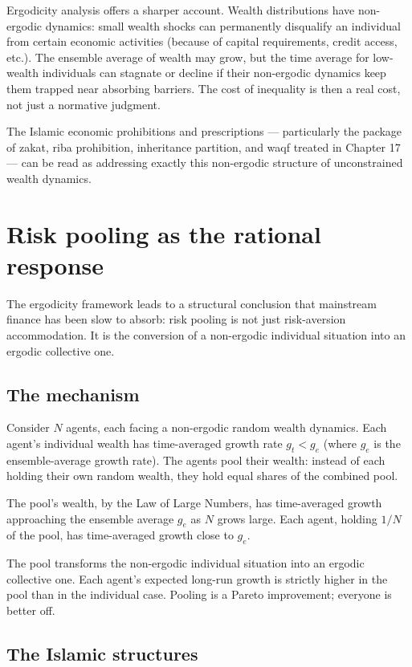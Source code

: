 Ergodicity analysis offers a sharper account. Wealth distributions
have non-ergodic dynamics: small wealth shocks can permanently
disqualify an individual from certain economic activities (because
of capital requirements, credit access, etc.). The ensemble average
of wealth may grow, but the time average for low-wealth individuals
can stagnate or decline if their non-ergodic dynamics keep them
trapped near absorbing barriers. The cost of inequality is then a
real cost, not just a normative judgment.

The Islamic economic prohibitions and prescriptions ---
particularly the package of zakat, riba prohibition, inheritance
partition, and waqf treated in Chapter 17 --- can be read as
addressing exactly this non-ergodic structure of unconstrained
wealth dynamics.

\section{Risk pooling as the rational response}
\label{sec:risk-pooling}

The ergodicity framework leads to a structural conclusion that
mainstream finance has been slow to absorb: risk pooling is not just
risk-aversion accommodation. It is the conversion of a non-ergodic
individual situation into an ergodic collective one.

\subsection{The mechanism}

Consider $N$ agents, each facing a non-ergodic random wealth
dynamics. Each agent's individual wealth has time-averaged growth
rate $g_t < g_e$ (where $g_e$ is the ensemble-average growth rate).
The agents pool their wealth: instead of each holding their own
random wealth, they hold equal shares of the combined pool.

The pool's wealth, by the Law of Large Numbers, has time-averaged
growth approaching the ensemble average $g_e$ as $N$ grows large.
Each agent, holding $1/N$ of the pool, has time-averaged growth
close to $g_e$.

The pool transforms the non-ergodic individual situation into an
ergodic collective one. Each agent's expected long-run growth is
strictly higher in the pool than in the individual case. Pooling is
a Pareto improvement; everyone is better off.

\subsection{The Islamic structures}

